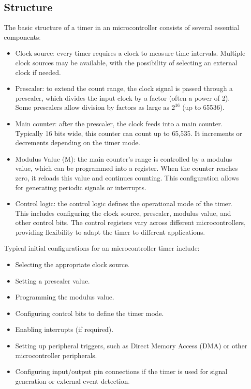 \subsection{Structure}
The basic structure of a timer in an microcontroller consists of several essential components:
\begin{itemize}
    \item Clock source: every timer requires a clock to measure time intervals. 
        Multiple clock sources may be available, with the possibility of selecting an external clock if needed.
    \item Prescaler: to extend the count range, the clock signal is passed through a prescaler, which divides the input clock by a factor (often a power of 2). 
        Some prescalers allow division by factors as large as $2^{16}$ (up to 65536).
    \item Main counter: after the prescaler, the clock feeds into a main counter. 
        Typically 16 bits wide, this counter can count up to 65,535. 
        It increments or decrements depending on the timer mode.
    \item Modulus Value (M): the main counter's range is controlled by a modulus value, which can be programmed into a register.
        When the counter reaches zero, it reloads this value and continues counting. 
        This configuration allows for generating periodic signals or interrupts.
    \item Control logic: the control logic defines the operational mode of the timer. 
        This includes configuring the clock source, prescaler, modulus value, and other control bits. 
        The control registers vary across different microcontrollers, providing flexibility to adapt the timer to different applications.
\end{itemize}
Typical initial configurations for an microcontroller timer include:
\begin{itemize}
    \item Selecting the appropriate clock source.
    \item Setting a prescaler value.
    \item Programming the modulus value.
    \item Configuring control bits to define the timer mode.
    \item Enabling interrupts (if required).
    \item Setting up peripheral triggers, such as Direct Memory Access (DMA) or other microcontroller peripherals.
    \item Configuring input/output pin connections if the timer is used for signal generation or external event detection.
\end{itemize}

